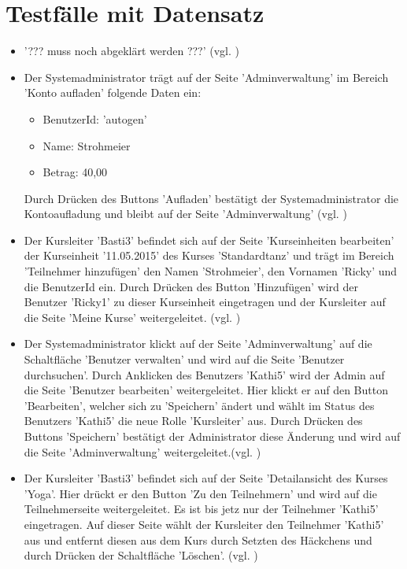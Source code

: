 \documentclass[a4paper]{scrreprt}
\newcounter{Lc}
\newcounter{Hc}
\newcommand{\stepHc}{\stepcounter{Hc}\setcounter{Lc}{0}}
\begin{document}
\section{Testfälle mit Datensatz}
			\stepHc
			\begin{itemize}
				\item {}
				'??? muss noch abgeklärt werden ???' (vgl. )
				
				\item {}
				Der Systemadministrator trägt auf der Seite 'Adminverwaltung' im Bereich 'Konto aufladen' folgende Daten ein:
				\begin{itemize}
					\item BenutzerId: 'autogen'
					\item Name: Strohmeier
					\item Betrag: 40,00
				\end{itemize}
				Durch Drücken des Buttons 'Aufladen' bestätigt der Systemadministrator die Kontoaufladung und bleibt auf der Seite 'Adminverwaltung' (vgl. )
				
				\item {}
				Der Kursleiter 'Basti3' befindet sich auf der Seite 'Kurseinheiten bearbeiten' der Kurseinheit '11.05.2015' des Kurses 'Standardtanz' und trägt im Bereich 'Teilnehmer hinzufügen' den Namen 'Strohmeier', den Vornamen 'Ricky' und die BenutzerId ein. Durch Drücken des Button 'Hinzufügen' wird der Benutzer 'Ricky1' zu dieser Kurseinheit eingetragen und der Kursleiter auf die Seite 'Meine Kurse' weitergeleitet. (vgl. )
						
				\item {} 
				Der Systemadministrator klickt auf der Seite 'Adminverwaltung' auf die Schaltfläche 'Benutzer verwalten' und wird auf die Seite 'Benutzer durchsuchen'. Durch Anklicken des Benutzers 'Kathi5' wird der Admin auf die Seite 'Benutzer bearbeiten' weitergeleitet. Hier klickt er auf den Button 'Bearbeiten', welcher sich zu 'Speichern' ändert und wählt im Status des Benutzers 'Kathi5' die neue Rolle 'Kursleiter' aus. Durch Drücken des Buttons 'Speichern' bestätigt der Administrator diese Änderung und wird auf die Seite 'Adminverwaltung' weitergeleitet.(vgl. )
				
				\item {}
				Der Kursleiter 'Basti3' befindet sich auf der Seite 'Detailansicht des Kurses 'Yoga'. Hier drückt er den Button 'Zu den Teilnehmern' und wird auf die Teilnehmerseite weitergeleitet. Es ist bis jetz nur der Teilnehmer 'Kathi5' eingetragen. Auf dieser Seite wählt der Kursleiter den Teilnehmer 'Kathi5' aus und entfernt diesen aus dem Kurs durch Setzten des Häckchens und durch Drücken der Schaltfläche 'Löschen'. (vgl. )
				

\end{itemize}
\end{document}
